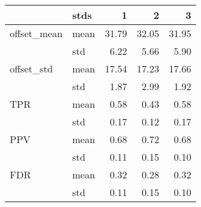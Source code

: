 \begin{tabular}{llrrr}
\toprule
            & stds &      1 &      2 &      3 \\
\midrule
offset\_mean & mean &  31.79 &  32.05 &  31.95 \\
            & std &   6.22 &   5.66 &   5.90 \\
offset\_std & mean &  17.54 &  17.23 &  17.66 \\
            & std &   1.87 &   2.99 &   1.92 \\
TPR & mean &   0.58 &   0.43 &   0.58 \\
            & std &   0.17 &   0.12 &   0.17 \\
PPV & mean &   0.68 &   0.72 &   0.68 \\
            & std &   0.11 &   0.15 &   0.10 \\
FDR & mean &   0.32 &   0.28 &   0.32 \\
            & std &   0.11 &   0.15 &   0.10 \\
\bottomrule
\end{tabular}
